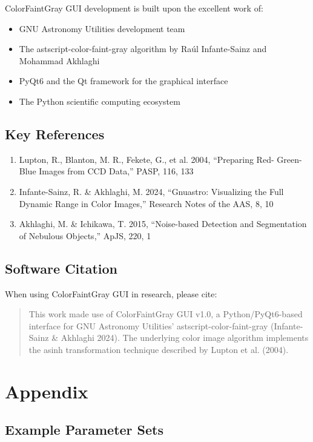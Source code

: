 \documentclass[11pt,a4paper]{article}
\begin{document}
ColorFaintGray GUI development is built upon the excellent work of:

\begin{itemize}[leftmargin=*]
\item GNU Astronomy Utilities development team
\item The astscript-color-faint-gray algorithm by Raúl Infante-Sainz and
Mohammad Akhlaghi
\item PyQt6 and the Qt framework for the graphical interface
\item The Python scientific computing ecosystem
\end{itemize}

\subsection{Key References}

\begin{enumerate}
\item Lupton, R., Blanton, M. R., Fekete, G., et al. 2004, ``Preparing Red-
Green-Blue Images from CCD Data,'' PASP, 116, 133
\item Infante-Sainz, R. \& Akhlaghi, M. 2024, ``Gnuastro: Visualizing the
Full Dynamic Range in Color Images,'' Research Notes of the AAS, 8, 10
\item Akhlaghi, M. \& Ichikawa, T. 2015, ``Noise-based Detection and
Segmentation of Nebulous Objects,'' ApJS, 220, 1
\end{enumerate}

\subsection{Software Citation}

When using ColorFaintGray GUI in research, please cite:

\begin{quote}
This work made use of ColorFaintGray GUI v1.0, a Python/PyQt6-based
interface for GNU Astronomy Utilities' astscript-color-faint-gray (Infante-
Sainz \& Akhlaghi 2024). The underlying color image algorithm implements the
asinh transformation technique described by Lupton et al. (2004).
\end{quote}

\section{Appendix}

\subsection{Example Parameter Sets}
\end{document}
